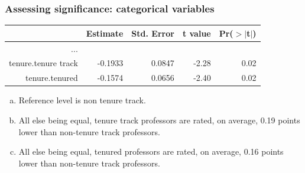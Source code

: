 \begin{frame}[fragile]
\frametitle{Assessing significance: categorical variables}


{\footnotesize
\begin{center}
\begin{tabular}{rrrrr}
  \hline
 & Estimate & Std. Error & t value & Pr($>$$|$t$|$) \\ 
  \hline
... \\
  tenure.tenure track & -0.1933 & 0.0847 & -2.28 & 0.02 \\ 
  tenure.tenured & -0.1574 & 0.0656 & -2.40 & 0.02 \\ 
   \hline
\end{tabular}
\end{center}
}

\begin{enumerate}[(a)]
\item Reference level is non tenure track.
\item All else being equal, tenure track professors are rated, on average, 0.19 points lower than non-tenure track professors.
\item All else being equal, tenured professors are rated, on average, 0.16 points lower than non-tenure track professors.
\end{enumerate}

\end{frame}



